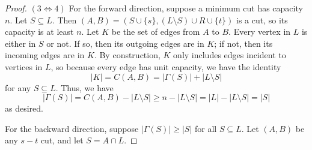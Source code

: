 \documentclass[11pt]{article}
\begin{document}
\begin{proof}
  $(3 \iff 4)$ For the forward direction, suppose a minimum cut has capacity $n$.
  Let $S \subseteq L$.
  Then $(A, B) = (S \cup \{s\}, (L \setminus S) \cup R \cup \{t\})$ is a cut, so its capacity is at least $n$.
  Let $K$ be the set of edges from $A$ to $B$.
  Every vertex in $L$ is either in $S$ or not.
  If so, then its outgoing edges are in $K$; if not, then its incoming edges are in $K$.
  By construction, $K$ only includes edges incident to vertices in $L$, so because every edge has unit capacity, we have the identity \[|K| = C(A, B) = |\Gamma(S)| + |L \setminus S|\] for any $S \subseteq L$.
  Thus, we have \[|\Gamma(S)| = C(A, B) - |L \setminus S| \geq n - |L \setminus S| = |L| - |L \setminus S| = |S|\]
  as desired.

  For the backward direction, suppose $|\Gamma(S)| \geq |S|$ for all $S \subseteq L$.
  Let $(A, B)$ be any $s-t$ cut, and let $S = A \cap L$.

\end{proof}
\end{document}
